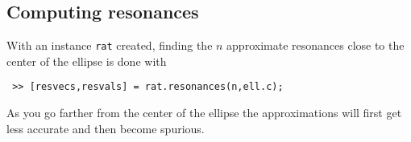\subsection{Computing resonances}

With an instance {\tt rat} created, 
finding the $n$ approximate resonances
close to the center of the ellipse 
is done with
\begin{verbatim}
 >> [resvecs,resvals] = rat.resonances(n,ell.c);
\end{verbatim}
As you go farther from the center of the ellipse the
approximations will first get less accurate and then 
become spurious.

